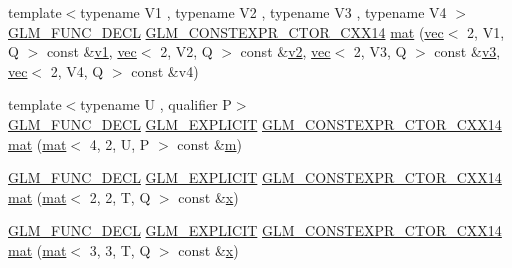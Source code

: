 \begin{DoxyCompactItemize}
\item 
{\footnotesize template$<$typename V1 , typename V2 , typename V3 , typename V4 $>$ }\\\hyperlink{setup_8hpp_ab2d052de21a70539923e9bcbf6e83a51}{G\+L\+M\+\_\+\+F\+U\+N\+C\+\_\+\+D\+E\+CL} \hyperlink{setup_8hpp_a0900f9145e68bf6061b6f5e7be3fa751}{G\+L\+M\+\_\+\+C\+O\+N\+S\+T\+E\+X\+P\+R\+\_\+\+C\+T\+O\+R\+\_\+\+C\+X\+X14} \hyperlink{structglm_1_1mat_3_014_00_012_00_01_t_00_01_q_01_4_a0a0b79d10d539aafa1d3985616846568}{mat} (\hyperlink{structglm_1_1vec}{vec}$<$ 2, V1, Q $>$ const \&\hyperlink{_s_d_l__opengl__glext_8h_a435c176a02c061b43e19bdf7c86cceae}{v1}, \hyperlink{structglm_1_1vec}{vec}$<$ 2, V2, Q $>$ const \&\hyperlink{_s_d_l__opengl__glext_8h_a0928f6d0f0f794ba000a21dfae422136}{v2}, \hyperlink{structglm_1_1vec}{vec}$<$ 2, V3, Q $>$ const \&\hyperlink{_s_d_l__opengl__glext_8h_acc806b31cbf466ceba6555983d8b814d}{v3}, \hyperlink{structglm_1_1vec}{vec}$<$ 2, V4, Q $>$ const \&v4)
\item 
{\footnotesize template$<$typename U , qualifier P$>$ }\\\hyperlink{setup_8hpp_ab2d052de21a70539923e9bcbf6e83a51}{G\+L\+M\+\_\+\+F\+U\+N\+C\+\_\+\+D\+E\+CL} \hyperlink{setup_8hpp_a6c74f5a5e7b134ab69023ff9a30d4d5d}{G\+L\+M\+\_\+\+E\+X\+P\+L\+I\+C\+IT} \hyperlink{setup_8hpp_a0900f9145e68bf6061b6f5e7be3fa751}{G\+L\+M\+\_\+\+C\+O\+N\+S\+T\+E\+X\+P\+R\+\_\+\+C\+T\+O\+R\+\_\+\+C\+X\+X14} \hyperlink{structglm_1_1mat_3_014_00_012_00_01_t_00_01_q_01_4_acae8a483921d714297536237a5f9013b}{mat} (\hyperlink{structglm_1_1mat}{mat}$<$ 4, 2, U, P $>$ const \&\hyperlink{_s_d_l__opengl__glext_8h_af593500c283bf1a787a6f947f503a5c2}{m})
\item 
\hyperlink{setup_8hpp_ab2d052de21a70539923e9bcbf6e83a51}{G\+L\+M\+\_\+\+F\+U\+N\+C\+\_\+\+D\+E\+CL} \hyperlink{setup_8hpp_a6c74f5a5e7b134ab69023ff9a30d4d5d}{G\+L\+M\+\_\+\+E\+X\+P\+L\+I\+C\+IT} \hyperlink{setup_8hpp_a0900f9145e68bf6061b6f5e7be3fa751}{G\+L\+M\+\_\+\+C\+O\+N\+S\+T\+E\+X\+P\+R\+\_\+\+C\+T\+O\+R\+\_\+\+C\+X\+X14} \hyperlink{structglm_1_1mat_3_014_00_012_00_01_t_00_01_q_01_4_a648a264835344580a07291ee28235d38}{mat} (\hyperlink{structglm_1_1mat}{mat}$<$ 2, 2, T, Q $>$ const \&\hyperlink{_s_d_l__opengl_8h_ad0e63d0edcdbd3d79554076bf309fd47}{x})
\item 
\hyperlink{setup_8hpp_ab2d052de21a70539923e9bcbf6e83a51}{G\+L\+M\+\_\+\+F\+U\+N\+C\+\_\+\+D\+E\+CL} \hyperlink{setup_8hpp_a6c74f5a5e7b134ab69023ff9a30d4d5d}{G\+L\+M\+\_\+\+E\+X\+P\+L\+I\+C\+IT} \hyperlink{setup_8hpp_a0900f9145e68bf6061b6f5e7be3fa751}{G\+L\+M\+\_\+\+C\+O\+N\+S\+T\+E\+X\+P\+R\+\_\+\+C\+T\+O\+R\+\_\+\+C\+X\+X14} \hyperlink{structglm_1_1mat_3_014_00_012_00_01_t_00_01_q_01_4_aa1a01b00304b56e7823dc494c0449e21}{mat} (\hyperlink{structglm_1_1mat}{mat}$<$ 3, 3, T, Q $>$ const \&\hyperlink{_s_d_l__opengl_8h_ad0e63d0edcdbd3d79554076bf309fd47}{x})

\end{DoxyCompactItemize}
